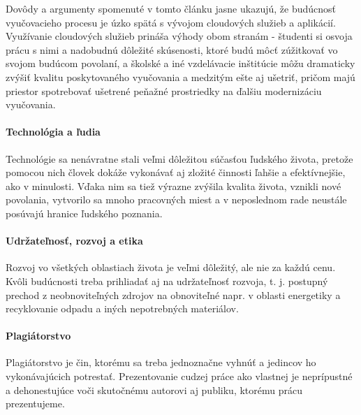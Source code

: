 \documentclass[10pt,slovak,a4paper]{article}%
\begin{document}
Dovôdy a argumenty spomenuté v tomto článku jasne ukazujú, že budúcnosť vyučovacieho procesu je úzko spätá s vývojom cloudových služieb a aplikácií. Využívanie cloudových služieb prináša výhody obom stranám - študenti si osvoja prácu s nimi a nadobudnú dôležité skúsenosti, ktoré budú môcť zúžitkovať vo svojom budúcom povolaní, a školské a iné vzdelávacie inštitúcie môžu dramaticky zvýšiť kvalitu poskytovaného vyučovania a medzitým ešte aj ušetriť, pričom majú priestor spotrebovať ušetrené peňažné prostriedky na ďalšiu modernizáciu vyučovania.

\paragraph{Technológia a ľudia}

Technológie sa nenávratne stali veľmi dôležitou súčasťou ľudského života, pretože pomocou nich človek dokáže vykonávať aj zložité činnosti ľahšie a efektívnejšie, ako v minulosti. Vďaka nim sa tiež výrazne zvýšila kvalita života, vznikli nové povolania, vytvorilo sa mnoho pracovných miest a v neposlednom rade neustále posúvajú hranice ľudského poznania.

\paragraph{Udržateľnosť, rozvoj a etika} 

Rozvoj vo všetkých oblastiach života je veľmi dôležitý, ale nie za každú cenu. Kvôli budúcnosti treba prihliadať aj na udržateľnosť rozvoja, t. j. postupný prechod z neobnoviteľných zdrojov na obnoviteľné napr. v oblasti energetiky a recyklovanie odpadu a iných nepotrebných materiálov. 

\paragraph{Plagiátorstvo}

Plagiátorstvo je čin, ktorému sa treba jednoznačne vyhnúť a jedincov ho vykonávajúcich potrestať. Prezentovanie cudzej práce ako vlastnej je neprípustné a dehonestujúce voči skutočnému autorovi aj publiku, ktorému prácu prezentujeme. 





\end{document}
